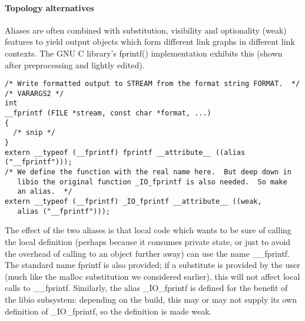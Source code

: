

\paragraph{Topology alternatives}
Aliases are often combined with substitution, visibility and optionality (weak) features 
to yield output objects which 
form different link graphs in different link contexts.
The GNU C library's \textsf{fprintf()} implementation
exhibits this (shown after preprocessing and lightly edited).

{\scriptsize\begin{lstlisting}
/* Write formatted output to STREAM from the format string FORMAT.  */
/* VARARGS2 */
int
__fprintf (FILE *stream, const char *format, ...)
{
  /* snip */
}
extern __typeof (__fprintf) fprintf __attribute__ ((alias ("__fprintf")));
/* We define the function with the real name here.  But deep down in
   libio the original function _IO_fprintf is also needed.  So make
   an alias.  */
extern __typeof (__fprintf) _IO_fprintf __attribute__ ((weak, 
   alias ("__fprintf")));
\end{lstlisting}}

The effect of the two aliases is that
local code which wants to be sure of calling the local definition
(perhaps because it consumes private state, or just to avoid the overhead 
of calling to an object further away) 
can use the name \textsf{\_\_fprintf}.
The standard name \textsf{fprintf} is also provided;
if a substitute is provided by the user 
(much like the \textsf{malloc} substitution we considered earlier),
this will not affect local calls to \textsf{\_\_fprintf}.
Similarly, the alias \textsf{\_IO\_fprintf} is defined
for the benefit of the \textsf{libio} subsystem: 
depending on the build,
this may or may not supply its own definition of \textsf{\_IO\_fprintf},
so the definition is made weak.

